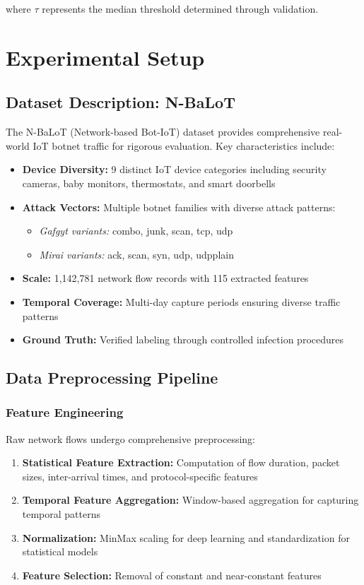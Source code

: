 \documentclass[conference]{IEEEtran}
\begin{document}
where $\tau$ represents the median threshold determined through validation.

\section{Experimental Setup}

\subsection{Dataset Description: N-BaLoT}

The N-BaLoT (Network-based Bot-IoT) dataset provides comprehensive real-world IoT botnet traffic for rigorous evaluation. Key characteristics include:

\begin{itemize}
\item \textbf{Device Diversity:} 9 distinct IoT device categories including security cameras, baby monitors, thermostats, and smart doorbells
\item \textbf{Attack Vectors:} Multiple botnet families with diverse attack patterns:
  \begin{itemize}
  \item \textit{Gafgyt variants:} combo, junk, scan, tcp, udp
  \item \textit{Mirai variants:} ack, scan, syn, udp, udpplain
  \end{itemize}
\item \textbf{Scale:} 1,142,781 network flow records with 115 extracted features
\item \textbf{Temporal Coverage:} Multi-day capture periods ensuring diverse traffic patterns
\item \textbf{Ground Truth:} Verified labeling through controlled infection procedures
\end{itemize}

\subsection{Data Preprocessing Pipeline}

\subsubsection{Feature Engineering}
Raw network flows undergo comprehensive preprocessing:
\begin{enumerate}
\item \textbf{Statistical Feature Extraction:} Computation of flow duration, packet sizes, inter-arrival times, and protocol-specific features
\item \textbf{Temporal Feature Aggregation:} Window-based aggregation for capturing temporal patterns
\item \textbf{Normalization:} MinMax scaling for deep learning and standardization for statistical models
\item \textbf{Feature Selection:} Removal of constant and near-constant features
\end{enumerate}
\end{document}
